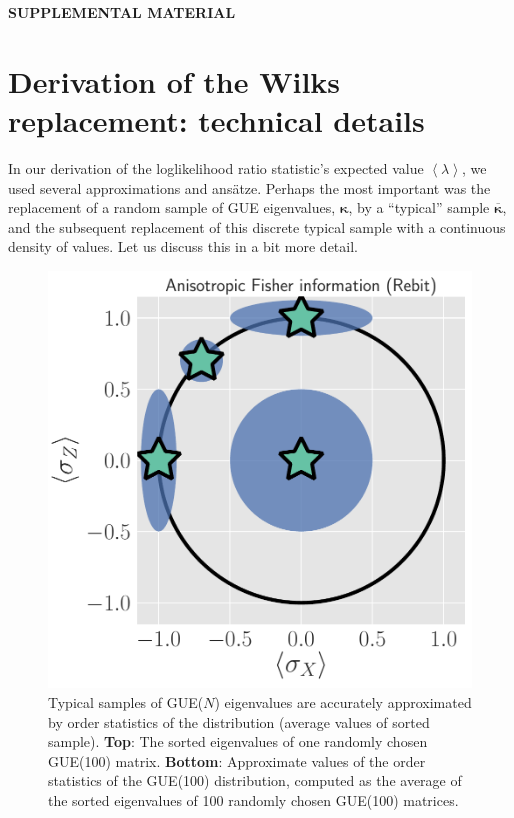 \documentclass[aps,pra, twocolumn]{revtex4}
\newcommand{\expect}[1]{\ensuremath{\left\langle#1\right\rangle}}
\newcommand{\bvec}[1]{\boldsymbol{#1}}
\begin{document}
\newpage
\newpage

\begin{center}\textbf{SUPPLEMENTAL MATERIAL}\end{center}

\section{Derivation of the Wilks replacement: technical details}
\label{app:technical}

In our derivation of the loglikelihood ratio statistic's expected value $\expect{\lambda}$, we used several approximations and ans\"atze.  Perhaps the most important was the replacement of a random sample of GUE eigenvalues, $\bvec{\kappa}$, by a ``typical'' sample $\overline{\bvec{\kappa}}$, and the subsequent replacement of this discrete typical sample with a continuous density of values.  Let us discuss this in a bit more detail.

\begin{figure}[h!]
\includegraphics[width=\columnwidth]{Images/Figure_5.pdf}
\caption{Typical samples of GUE($N$) eigenvalues are accurately approximated by order statistics of the distribution (average values of sorted sample).  \textbf{Top}:  The sorted eigenvalues of one randomly chosen GUE(100) matrix.  \textbf{Bottom}:  Approximate values of the order statistics of the GUE(100) distribution, computed as the average of the sorted eigenvalues of 100 randomly chosen GUE(100) matrices.}
\label{fig:orderstatistics1}
\end{figure}
\end{document}
